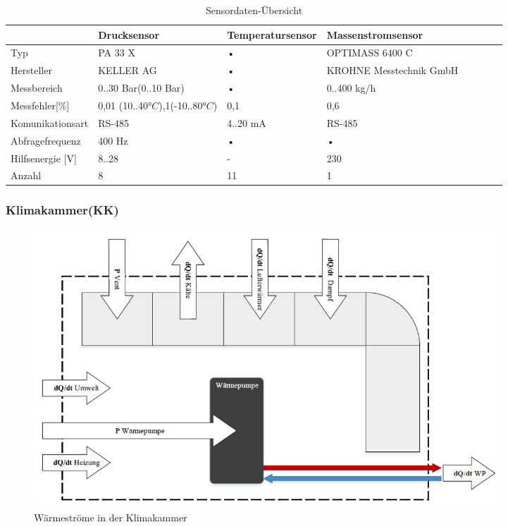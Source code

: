 \begin{table}[htb]
\centering
\caption{Sensordaten-Übersicht}\vspace{6pt}
\label{tab:Messtechnik KA}
\begin{tabular}{p{3cm}p{3cm}p{3cm}p{3.5cm}llll}
\hline 
 & \textbf{Drucksensor} & \textbf{Temperatursensor} & \textbf{Massenstromsensor} \\ 
\hline 
\hline 
Typ & PA 33 X & • & OPTIMASS 6400 C \\ 
\hline 
Hersteller & KELLER AG & • &  KROHNE Messtechnik GmbH \\ 
\hline 
Messbereich & 0..30 Bar(0..10 Bar) & • & 0..400 kg/h \\ 
\hline 
Messfehler[$\%$] & 0,01 (10..40$°C$)\newline 0,1(-10..80$°C$) & 0,1  & 0,6 \\ 
\hline 
Komunikationsart & RS-485 & 4..20 mA & RS-485 \\ 
\hline 
Abfragefrequenz & 400 Hz & • & • \\ 
\hline 
Hilfsenergie [V] & 8..28 & - & 230  \\ 
\hline
Anzahl & 8  & 11 & 1 \\ 
\hline 
\hline 
\end{tabular} 
\label{tab:Tabelle}
\end{table}

\newpage
\subsubsection{Klimakammer(KK)}
\label{subsec:Klimakammer}
\begin{figure}[htb]
\centering		\includegraphics[width=0.850\textwidth]{Pictures/HIL2.png}
\caption{Wärmeströme in der Klimakammer \citep{Nuerenberg2015}}
\label{fig:KK}
\end{figure}


